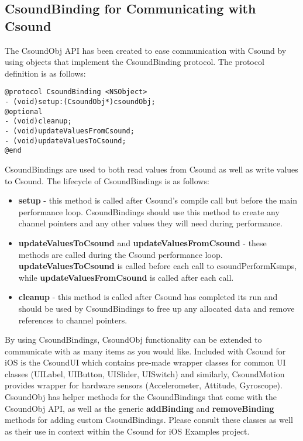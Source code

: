 \documentclass[11pt]{article}
\begin{document}
\subsection{CsoundBinding for Communicating with Csound}

The CsoundObj API has been created to ease communication with Csound by using objects that implement the CsoundBinding protocol.  The protocol definition is as follows:

\begin{lstlisting}[caption=CsoundBinding Protocol Definition]
@protocol CsoundBinding <NSObject>
- (void)setup:(CsoundObj*)csoundObj;
@optional
- (void)cleanup;
- (void)updateValuesFromCsound;
- (void)updateValuesToCsound;
@end
\end{lstlisting}

CsoundBindings are used to both read values from Csound as well as write values to Csound.  The lifecycle of CsoundBindings is as follows:

\begin{itemize}
\item \textbf{setup} - this method is called after Csound's compile call but before the main performance loop. CsoundBindings should use this method to create any channel pointers and any other values they will need during performance.
\item \textbf{updateValuesToCsound} and \textbf{updateValuesFromCsound} - these methods are called during the Csound performance loop. \textbf{updateValuesToCsound} is called before each call to csoundPerformKsmps, while \textbf{updateValuesFromCsound} is called after each call.
\item \textbf{cleanup} - this method is called after Csound has completed its run and should be used by CsoundBindings to free up any allocated data and remove references to channel pointers.
\end{itemize}

By using CsoundBindings, CsoundObj functionality can be extended to communicate with as many items as you would like. Included with Csound for iOS is the CsoundUI which contains pre-made wrapper classes for common UI classes (UILabel, UIButton, UISlider, UISwitch) and similarly, CsoundMotion provides wrapper for hardware sensors (Accelerometer, Attitude, Gyroscope).  CsoundObj has helper methods for the CsoundBindings that come with the CsoundObj API, as well as the generic \textbf{addBinding} and \textbf{removeBinding} methods for adding custom CsoundBindings. Please consult these classes as well as their use in context within the Csound for iOS Examples project.
\end{document}
